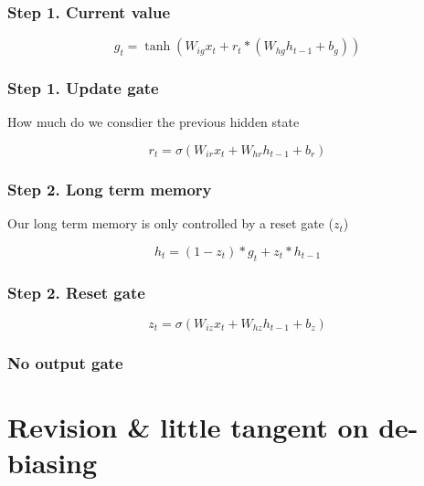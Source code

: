 \documentclass[11pt]{article}
\begin{document}
\subsubsection{Step 1. Current value}

\begin{equation*}
    g_t = \tanh(W_{ig}x_t + r_t \ast (W_{hg}h_{t-1} + b_g))
\end{equation*}

\subsubsection{Step 1. Update gate}

How much do we consdier the previous hidden state

\begin{equation*}
    r_t = \sigma(W_{ir}x_t + W_{hr}h_{t-1} + b_r)
\end{equation*}

\subsubsection{Step 2. Long term memory}

Our long term memory is only controlled by a reset gate ($z_t$)

\begin{equation*}
    h_t = (1-z_t) \ast g_t + z_t \ast h_{t-1}
\end{equation*}

\subsubsection{Step 2. Reset gate}

\begin{equation*}
    z_t = \sigma(W_{iz}x_t + W_{hz}h_{t-1} + b_z)
\end{equation*}

\subsubsection{No output gate}


\section{Revision \& little tangent on de-biasing}

\printbibliography
{}
\end{document}
